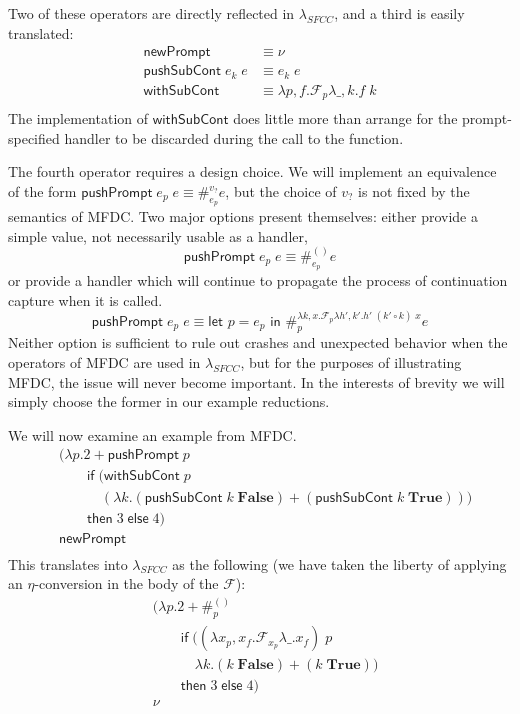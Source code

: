 \documentclass[11pt]{article}
\newcommand{\letin}[2]{\textsf{let }#1\textsf{ in }#2}
\newcommand\F{\mathcal{F}}
\begin{document}
Two of these operators are directly reflected in $\lambda_{SFCC}$, and a third is easily translated:
\begin{align*}
\mathsf{newPrompt} &\equiv \nu \\
\mathsf{pushSubCont}\;e_k\;e &\equiv e_k\;e \\
\mathsf{withSubCont} &\equiv
    \lambda p,f. \F_{p}\lambda \_,k. f\;k \\
\end{align*}
The implementation of $\mathsf{withSubCont}$ does little more than arrange for the prompt-specified handler to be discarded during the call to the function.

The fourth operator requires a design choice.
We will implement an equivalence of the form $\mathsf{pushPrompt}\;e_p\;e \equiv \#_{e_p}^{v_?}e$, but the choice of $v_?$ is not fixed by the semantics of MFDC.
Two major options present themselves:
either provide a simple value, not necessarily usable as a handler,
$$\mathsf{pushPrompt}\;e_p\;e \equiv \#_{e_p}^{()}e$$
or provide a handler which will continue to propagate the process of continuation capture when it is called.
$$\mathsf{pushPrompt}\;e_p\;e \equiv
    \letin{p=e_p}\#_{p}^{\lambda k,x.\F_{p}\lambda h',k'.h'\;(k' \circ k)\;x}e$$
Neither option is sufficient to rule out crashes and unexpected behavior when the operators of MFDC are used in $\lambda_{SFCC}$, but for the purposes of illustrating MFDC, the issue will never become important.
In the interests of brevity we will simply choose the former in our example reductions.

We will now examine an example from MFDC.
\begin{align*}
&(\lambda p. 2 + \mathsf{pushPrompt}\;p \\
&\qquad \mathsf{if}\;(\mathsf{withSubCont}\;p \\
&\qquad\quad (\lambda k. (\mathsf{pushSubCont}\;k\;\mathbf{False}) +
            (\mathsf{pushSubCont}\;k\;\mathbf{True}))) \\
&\qquad \mathsf{then}\;3\;\mathsf{else}\;4) \\
&\mathsf{newPrompt} \\
\end{align*}
This translates into $\lambda_{SFCC}$ as the following (we have taken the liberty of applying an $\eta$-conversion in the body of the $\F$):
\begin{align*}
&(\lambda p. 2 + \#_p^{()} \\
&\qquad \mathsf{if}\;((\lambda x_p,x_f. \F_{x_p}\lambda \_.x_f)\;p \\
&\qquad\quad \lambda k. (k\;\mathbf{False}) +
            (k\;\mathbf{True})) \\
&\qquad \mathsf{then}\;3\;\mathsf{else}\;4) \\
&\nu \\
\end{align*}
\end{document}
